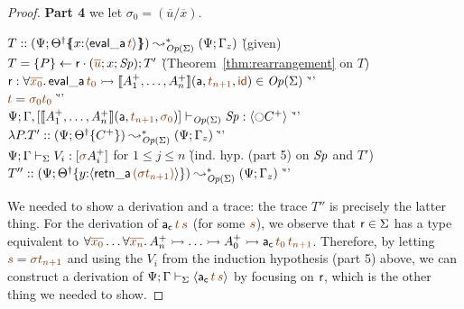 \begin{proof}
\noindent
{\bf Part 4}
we let $\sigma_0 = (\overline{u}/\overline{x})$. 
\begin{tabbing}
$T :: (\Psi; \frameoff{\opsubst{\Theta}}{x{:}\susp{{\sf eval\_a}\,\lf{t}}}) 
       \leadsto^*_{\transop{\Sigma}} 
      (\Psi; \Gamma_z)$
 \` (given)
\\
$T = \tstep{P}{\sf r}{(\lf{\overline{u}}; x; \Sp)}; T'$
 \` (Theorem~\ref{thm:rearrangement} on $T$)
\\
\qquad ${\sf r} : \forall \lf{\overline{x_0}}.\, {\sf eval\_a}\,\lf{t_0} \lefti 
   \opbasic{A^+_1, \ldots, A^+_n}{t_{n+1}}{\sf id} \in \transop{\Sigma}$ 
 \` ''\qquad\qquad~
\\
\qquad $\lf{t} = \lf{{\sigma_0}t_0}$ 
 \` ''\qquad\qquad~
\\
\qquad $\slst{\transop{\Sigma}}{\Psi}{\Gamma,[\opbasic{A_1^+,\ldots,A_n^+}{t_{n+1}}{\sigma_0}]}{\Sp}{\susp{{\ocircle} C^+}}$ 
 \` ''\qquad\qquad~
\\
\qquad $\lambda P.T' :: (\Psi; {{{\Theta}^\dag}}\{{C^+}\})
         \leadsto^*_{{\it Op}({\Sigma})}
       (\Psi; \Gamma_z)$ 
 \` ''\qquad\qquad~
\\
$\slst{\Sigma}{\Psi}{\Gamma}{V_i}{[\lf{\sigma}{A^+_i}]}$ for $1 \leq j \leq n$
\` (ind. hyp. (part 5) on ${\it Sp}$ and $T'$)
\\
$T'' :: (\Psi; \tackon{\opsubst{\Theta}}
                 {y{:}\susp{{\sf retn\_a}\,\lf{({\sigma}t_{n+1})}}})
         \leadsto^*_{\transop{\Sigma}}
        (\Psi; \Gamma_z)$
 \` ''\qquad\qquad~
\end{tabbing}

\noindent
We needed to show a derivation and a trace: the trace $T''$ is
precisely the latter thing. For the derivation of ${\sf
  a_c}\,\lf{t}\,\lf{s}$ (for some $\lf{s}$), we observe that ${\sf r}
\in \Sigma$ has a type equivalent to $\forall
\lf{\overline{x_0}}\ldots \forall \lf{\overline{x_n}}.\, A^+_n \lefti
\ldots \lefti A^+_0 \lefti {\sf a_c}\,\lf{t_0}\,\lf{t_{n+1}}$.
Therefore, by letting $\lf{s} = \lf{{\sigma}t_{n+1}}$ and using the
$V_i$ from the induction hypothesis (part 5) above, we can construct a
derivation of $\slss{\Sigma}{\Psi}{\Gamma}{\susp{{\sf
      a_c}\,\lf{t}\,\lf{s}}}$ by focusing on ${\sf r}$, which is the
other thing we needed to show.


\end{proof}
